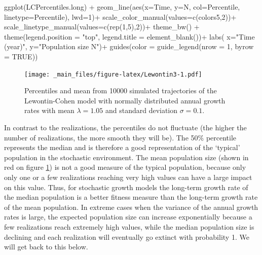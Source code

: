 \documentclass[
]{book}
\newenvironment{Shaded}{\begin{snugshade}}{\end{snugshade}}
\newcommand{\AttributeTok}[1]{\textcolor[rgb]{0.77,0.63,0.00}{#1}}
\newcommand{\ConstantTok}[1]{\textcolor[rgb]{0.00,0.00,0.00}{#1}}
\newcommand{\DecValTok}[1]{\textcolor[rgb]{0.00,0.00,0.81}{#1}}
\newcommand{\FunctionTok}[1]{\textcolor[rgb]{0.00,0.00,0.00}{#1}}
\newcommand{\NormalTok}[1]{#1}
\newcommand{\SpecialCharTok}[1]{\textcolor[rgb]{0.00,0.00,0.00}{#1}}
\newcommand{\StringTok}[1]{\textcolor[rgb]{0.31,0.60,0.02}{#1}}
\begin{document}
\begin{Shaded}
\begin{Highlighting}[]
\FunctionTok{ggplot}\NormalTok{(LCPercentiles.long) }\SpecialCharTok{+} 
  \FunctionTok{geom\_line}\NormalTok{(}\FunctionTok{aes}\NormalTok{(}\AttributeTok{x=}\NormalTok{Time, }\AttributeTok{y=}\NormalTok{N, }\AttributeTok{col=}\NormalTok{Percentile,}
                \AttributeTok{linetype=}\NormalTok{Percentile), }\AttributeTok{lwd=}\DecValTok{1}\NormalTok{)}\SpecialCharTok{+}
  \FunctionTok{scale\_color\_manual}\NormalTok{(}\AttributeTok{values=}\FunctionTok{c}\NormalTok{(colors5,}\DecValTok{2}\NormalTok{))}\SpecialCharTok{+}
  \FunctionTok{scale\_linetype\_manual}\NormalTok{(}\AttributeTok{values=}\FunctionTok{c}\NormalTok{(}\FunctionTok{rep}\NormalTok{(}\DecValTok{1}\NormalTok{,}\DecValTok{5}\NormalTok{),}\DecValTok{2}\NormalTok{))}\SpecialCharTok{+}
  \FunctionTok{theme\_bw}\NormalTok{() }\SpecialCharTok{+}
   \FunctionTok{theme}\NormalTok{(}\AttributeTok{legend.position =} \StringTok{"top"}\NormalTok{,}
         \AttributeTok{legend.title =} \FunctionTok{element\_blank}\NormalTok{())}\SpecialCharTok{+}
  \FunctionTok{labs}\NormalTok{( }\AttributeTok{x=}\StringTok{"Time (year)"}\NormalTok{, }\AttributeTok{y=}\StringTok{"Population size N"}\NormalTok{)}\SpecialCharTok{+}
  \FunctionTok{guides}\NormalTok{(}\AttributeTok{color =} \FunctionTok{guide\_legend}\NormalTok{(}\AttributeTok{nrow =} \DecValTok{1}\NormalTok{, }\AttributeTok{byrow =} \ConstantTok{TRUE}\NormalTok{))}
\end{Highlighting}
\end{Shaded}

\begin{figure}
\centering
\texttt{[image: \_main\_files/figure-latex/Lewontin3-1.pdf]}
\caption{\label{fig:Lewontin3}Percentiles and mean from 10000 simulated trajectories of the Lewontin-Cohen model with normally distributed annual growth rates with mean \(\lambda=1.05\) and standard deviation \(\sigma=0.1\).}
\end{figure}

In contrast to the realizations, the percentiles do not fluctuate (the higher the number of realizations, the more smooth they will be). The 50\(\%\) percentile represents the median and is therefore a good representation of the `typical' population in the stochastic environment. The mean population size (shown in red on figure \ref{fig:Lewontin3}) is not a good measure of the typical population, because only only one or a few realizations reaching very high values can have a large impact on this value. Thus, for stochastic growth models the long-term growth rate of the median population is a better fitness measure than the long-term growth rate of the mean population. In extreme cases when the variance of the annual growth rates is large, the expected population size can increase exponentially because a few realizations reach extremely high values, while the median population size is declining and each realization will eventually go extinct with probability 1.
We will get back to this below.
\end{document}
